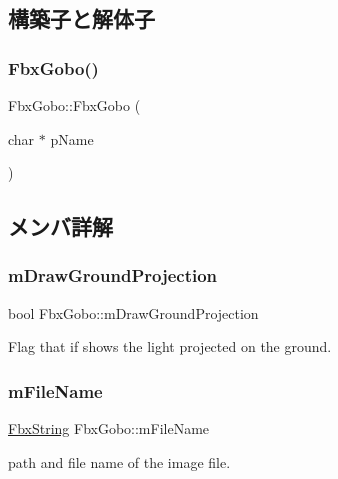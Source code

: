 \subsection{構築子と解体子}
\mbox{\label{class_fbx_gobo_a2f7f2ac035e00dcc2b89b70b3d317b01}} 
\subsubsection{\texorpdfstring{Fbx\+Gobo()}{FbxGobo()}}
{\footnotesize\ttfamily Fbx\+Gobo\+::\+Fbx\+Gobo (\begin{DoxyParamCaption}\item[{char $\ast$}]{p\+Name }\end{DoxyParamCaption})}



\subsection{メンバ詳解}
\mbox{\label{class_fbx_gobo_a1c8766e60f641764794d1d444bbf3a7b}} 
\subsubsection{\texorpdfstring{m\+Draw\+Ground\+Projection}{mDrawGroundProjection}}
{\footnotesize\ttfamily bool Fbx\+Gobo\+::m\+Draw\+Ground\+Projection}



Flag that if shows the light projected on the ground. 

\mbox{\label{class_fbx_gobo_a5b092ea9f3fd2f5c589135e8fe4f5ef6}} 
\subsubsection{\texorpdfstring{m\+File\+Name}{mFileName}}
{\footnotesize\ttfamily \hyperlink{class_fbx_string}{Fbx\+String} Fbx\+Gobo\+::m\+File\+Name}



path and file name of the image file. 

